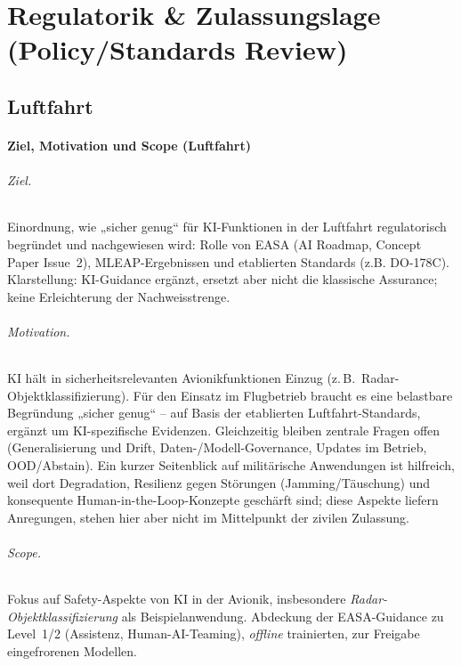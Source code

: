 \part{Regulatorik \& Zulassungslage (Policy/Standards Review)}
\chapter{Luftfahrt}

\subsection{Ziel, Motivation und Scope (Luftfahrt)}
\paragraph{Ziel.}
Einordnung, wie „sicher genug“ für KI-Funktionen in der Luftfahrt regulatorisch begründet und nachgewiesen wird: Rolle von EASA (AI Roadmap, Concept Paper Issue~2), MLEAP-Ergebnissen und etablierten Standards (z.B. DO-178C). Klarstellung: KI-Guidance ergänzt, ersetzt aber nicht die klassische Assurance; keine Erleichterung der Nachweisstrenge.

\paragraph{Motivation.}
KI hält in sicherheitsrelevanten Avionikfunktionen Einzug (z.\,B.\ Radar-Objektklassifizierung). Für den Einsatz im Flugbetrieb braucht es eine belastbare Begründung „sicher genug“ – auf Basis der etablierten Luftfahrt-Standards, ergänzt um KI-spezifische Evidenzen. Gleichzeitig bleiben zentrale Fragen offen (Generalisierung und Drift, Daten-/Modell-Governance, Updates im Betrieb, OOD/Abstain). Ein kurzer Seitenblick auf militärische Anwendungen ist hilfreich, weil dort Degradation, Resilienz gegen Störungen (Jamming/Täuschung) und konsequente Human-in-the-Loop-Konzepte geschärft sind; diese Aspekte liefern Anregungen, stehen hier aber nicht im Mittelpunkt der zivilen Zulassung.

\paragraph{Scope.}
Fokus auf Safety-Aspekte von KI in der Avionik, insbesondere \emph{Radar-Objektklassifizierung} als Beispielanwendung. Abdeckung der EASA-Guidance zu Level~1/2 (Assistenz, Human-AI-Teaming), \emph{offline} trainierten, zur Freigabe eingefrorenen Modellen.





